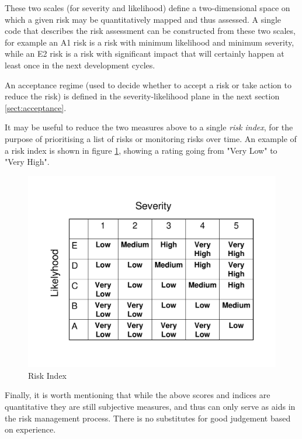 These two scales (for severity and likelihood) define a two-dimensional space on which a given risk may be quantitatively mapped and thus assessed. A single code that describes the risk assessment can be constructed from these two scales, for example an A1 risk is a risk with minimum likelihood and minimum severity, while an E2 risk is a risk with significant impact that will certainly happen at least once in the next development cycles.

An acceptance regime (used to decide whether to accept a risk or take action to reduce the risk) is defined in the severity-likelihood plane in the next section \ref{sect:acceptance}.

It may be useful to reduce the two measures above to a single {\em risk index}, for the purpose of prioritising a list of risks or monitoring risks over time. An example of a risk index is shown in figure \ref{fig:riskindex}, showing a rating going from "Very Low" to "Very High".

  \begin{figure}[H]
  \begin{center}
  	\includegraphics[scale=0.5]{images/RiskIndex}
  \end{center}
\vspace{-2cm}
\caption{Risk Index \label{fig:riskindex}}
   \end{figure}

Finally, it is worth mentioning that while the above scores and indices are quantitative they are still subjective measures, and thus can only serve as aids in the risk management process. There is no substitutes for good judgement based on experience.

